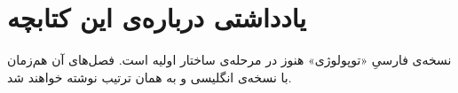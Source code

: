 \chapter*{یادداشتی درباره‌ی این کتابچه}

نسخه‌ی فارسیِ «توپولوژی» هنوز در مرحله‌ی ساختار اولیه است. فصل‌های آن هم‌زمان با نسخه‌ی انگلیسی و به همان ترتیب نوشته خواهند شد.
